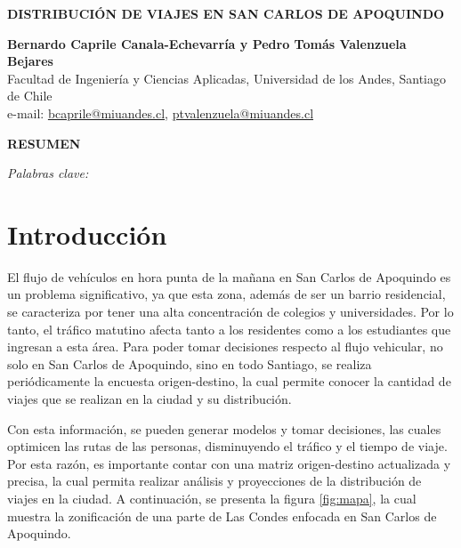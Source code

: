\documentclass[letterpaper,12pt]{article}
\begin{document}
\begin{titlepage}
    \begin{center}
      \vspace*{1cm}

    \textbf{\Large DISTRIBUCIÓN DE VIAJES EN SAN CARLOS DE APOQUINDO}
    
    \vspace{1cm}
    
    \textbf{Bernardo Caprile Canala-Echevarría y Pedro Tomás Valenzuela Bejares}\\
    Facultad de Ingeniería y Ciencias Aplicadas, Universidad de los Andes, Santiago de Chile\\
    e-mail: \href{mailto:bcaprile@miuandes.cl}{bcaprile@miuandes.cl}, \href{mailto: ptvalenzuela@miuandes.cl}{ptvalenzuela@miuandes.cl}
    
    \vspace{2cm}
    
    \textbf{RESUMEN}
    
    \vspace{0.5cm}  
    \end{center}
    
    \textit{Palabras clave:}
\end{titlepage}

\newpage

\section{Introducción}

El flujo de vehículos en hora punta de la mañana en San Carlos de Apoquindo es un problema significativo, ya que esta zona, además de ser un barrio residencial, se caracteriza por tener una alta concentración de colegios y universidades. Por lo tanto, el tráfico matutino afecta tanto a los residentes como a los estudiantes que ingresan a esta área. Para poder tomar decisiones respecto al flujo vehicular, no solo en San Carlos de Apoquindo, sino en todo Santiago, se realiza periódicamente la encuesta origen-destino, la cual permite conocer la cantidad de viajes que se realizan en la ciudad y su distribución.

Con esta información, se pueden generar modelos y tomar decisiones, las cuales optimicen las rutas de las personas, disminuyendo el tráfico y el tiempo de viaje. Por esta razón, es importante contar con una matriz origen-destino actualizada y precisa, la cual permita realizar análisis y proyecciones de la distribución de viajes en la ciudad. A continuación, se presenta la figura \ref{fig:mapa}, la cual muestra la zonificación de una parte de Las Condes enfocada en San Carlos de Apoquindo. 
\end{document}
